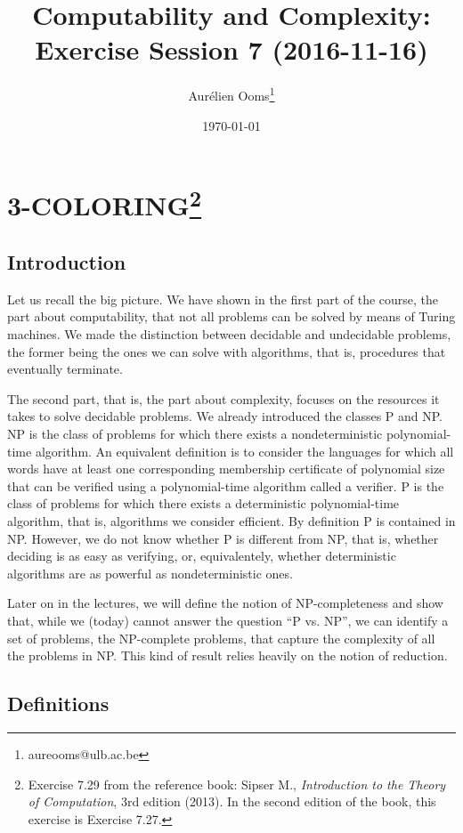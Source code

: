 \documentclass{article}
\title{Computability and Complexity:\\Exercise Session 7 (2016-11-16)}
\author{Aurélien Ooms\footnote{aureooms@ulb.ac.be}}
\date{\today}
\begin{document}
\maketitle
\tableofcontents

\section{3-COLORING\footnote{%
Exercise 7.29 from the reference book: Sipser M.,
\emph{Introduction to the Theory of Computation}, 3rd edition (2013).
In the second edition of the book, this exercise is Exercise 7.27.}}

\subsection{Introduction}

Let us recall the big picture. We have shown in the first part of the course,
the part about computability, that not all problems can be solved by means of
Turing machines. We made the distinction between decidable and undecidable
problems, the former being the ones we can solve with algorithms, that is,
procedures that eventually terminate.

The second part, that is, the part about complexity, focuses on the resources
it takes to solve decidable problems. We already introduced the classes P and
NP\@. NP is the class of problems for which there exists a nondeterministic
polynomial-time algorithm. An equivalent definition is to consider the
languages for which all words have at least one corresponding membership
certificate of polynomial size that can be verified using a polynomial-time
algorithm called a verifier. P is the class of problems for which there exists
a deterministic polynomial-time algorithm, that is, algorithms we consider
efficient. By definition P is contained in NP\@.
However, we do not know whether P is different from NP, that is, whether
deciding is as easy as verifying, or, equivalentely, whether deterministic
algorithms are as powerful as nondeterministic ones.

Later on in the lectures, we will define the notion of NP-completeness and show
that, while we (today) cannot answer the question ``P vs. NP'', we can identify
a set of problems, the NP-complete problems, that capture the complexity of all
the problems in NP\@. This kind of result relies heavily on the notion of
reduction.

\subsection{Definitions}
\end{document}
